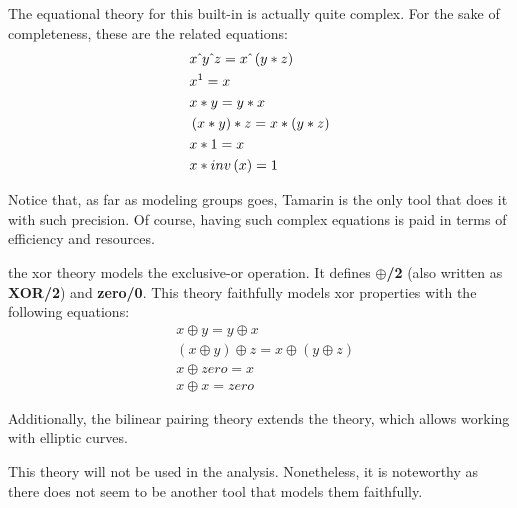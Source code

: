 \begin{description}[style=nextline]
    The equational theory for this built-in is actually quite complex. For the sake of completeness, these are the related equations:
    \begin{equation}
      \begin{aligned}
         & x \hat{\mkern6mu} y \hat{\mkern6mu} z = x \hat{\mkern6mu} \left(y * z\right) \\
         & x ^ 1 = x                                         \\
         & x * y = y * x                                     \\
         & \left(x * y\right) * z = x * \left(y * z\right)   \\
         & x * 1 = x                                         \\
         & x * inv\left(x\right) = 1
      \end{aligned}
    \end{equation}

    Notice that, as far as modeling groups goes, Tamarin is the only tool that does it with such precision. Of course, having such complex equations is paid in terms of efficiency and resources.
  \item[xor and bilinear-pairing] the xor theory models the exclusive-or operation. It defines \textbf{$\oplus$/2} (also written as \textbf{XOR/2}) and \textbf{zero/0}. This theory faithfully models xor properties with the following equations:
    \begin{equation}
      \begin{aligned}
         & x \oplus y = y \oplus x                                             \\
         & \left(x \oplus y\right) \oplus z = x \oplus \left(y \oplus z\right) \\
         & x \oplus zero = x                                                   \\
         & x \oplus x = zero
      \end{aligned}
    \end{equation}

    Additionally, the bilinear pairing theory extends the \DiHe{} theory, which allows working with elliptic curves.

    This theory will not be used in the analysis. Nonetheless, it is noteworthy as there does not seem to be another tool that models them faithfully.
\end{description}

